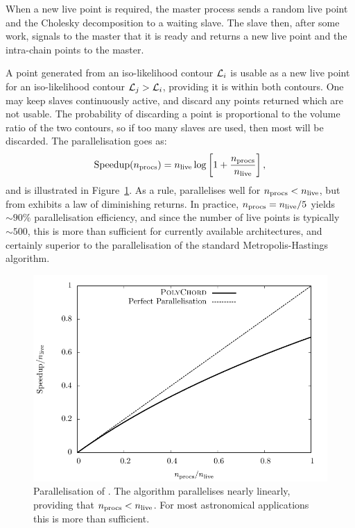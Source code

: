 When a new live point is required, the master process sends a random live point and the Cholesky decomposition to a waiting slave.  The slave then, after some work, signals to the master that it is ready and returns a new live point and the intra-chain points to the master.

A point generated from an iso-likelihood contour $\mathcal{L}_i$ is usable as a new live point for an iso-likelihood contour $\mathcal{L}_j>\mathcal{L}_i$, providing it is within both contours.  One may keep slaves continuously active, and discard any points returned which are not usable.  The probability of discarding a point is proportional to the volume ratio of the two contours, so if too many slaves are used, then most will be discarded.  The parallelisation goes as:
\begin{equation}
  \text{Speedup}(n_{\mathrm{procs}}) = n_{\mathrm{live}}\log\left[ 1 + \frac{n_{\mathrm{procs}}}{n_{\mathrm{live}}} \right],
  \label{eqn:pc:parallel}
\end{equation}
and is illustrated in Figure~\ref{fig:pc:parallel}. 
As a rule, \PolyChord{} parallelises well for $n_{\mathrm{procs}}<n_{\mathrm{live}}$, but from exhibits a law of diminishing returns. In practice, $n_{\mathrm{procs}} = n_{\mathrm{live}}/5$ yields $\sim90\%$ parallelisation efficiency, and
since the number of live points is typically $\sim500$, this is more than sufficient for currently available \openMPI{} architectures, and certainly superior to the parallelisation of the standard Metropolis-Hastings algorithm.
%
\begin{figure}[tp]
  \centering
  \includegraphics[width=\columnwidth]{chapter_polychord/figures/parallel}
  \caption{%
Parallelisation of \PolyChord{}. 
The algorithm parallelises nearly linearly, providing that $n_{\mathrm{procs}}<n_{\mathrm{live}}$. For most astronomical applications this is more than sufficient.\label{fig:pc:parallel}}
\end{figure}
%
